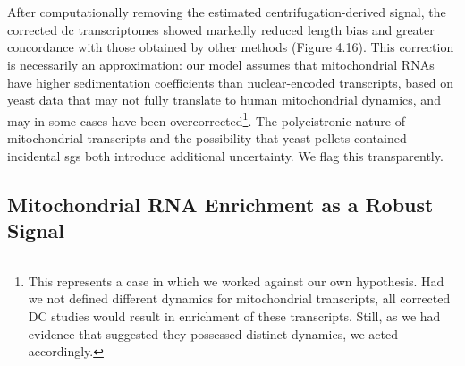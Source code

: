 \\
\\
After computationally removing the estimated centrifugation-derived signal, the corrected \gls{dc} transcriptomes showed markedly reduced length bias and greater concordance with those obtained by other methods (Figure 4.16). This correction is necessarily an approximation: our model assumes that mitochondrial RNAs have higher sedimentation coefficients than nuclear-encoded transcripts, based on yeast data\cite{glauninger_transcriptome-wide_2025} that may not fully translate to human mitochondrial dynamics, and may in some cases have been overcorrected\footnote{This represents a case in which we worked against our own hypothesis. Had we not defined different dynamics for mitochondrial transcripts, all corrected DC studies would result in enrichment of these transcripts. Still, as we had evidence that suggested they possessed distinct dynamics, we acted accordingly.}. The polycistronic nature of mitochondrial transcripts\cite{dsouza_mitochondrial_2018} and the possibility that yeast pellets contained incidental \glspl{sg} both introduce additional uncertainty. We flag this transparently.

\subsection{Mitochondrial RNA Enrichment as a Robust Signal}

